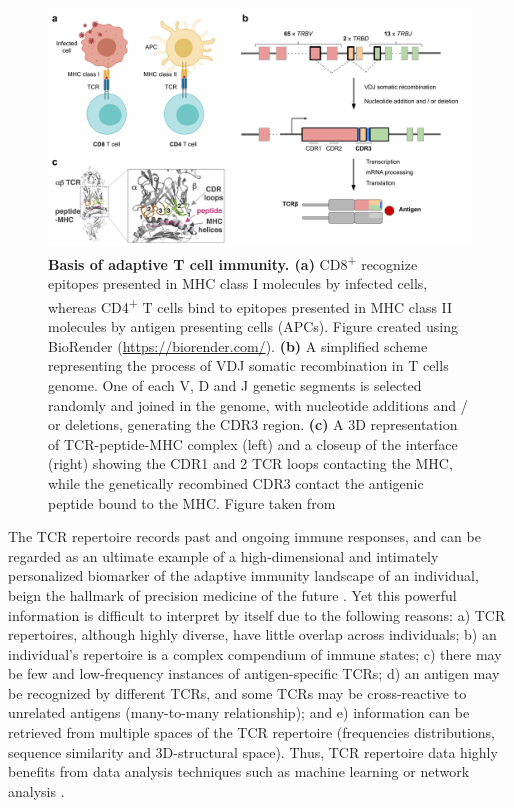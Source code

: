 \begin{figure}[!t]
	\centering
	\includegraphics[width=\textwidth,keepaspectratio]{figures/introtcr.pdf}
	\caption{\textbf{Basis of adaptive T cell immunity. (a)} CD8\textsuperscript{+} recognize epitopes presented in MHC class I molecules by infected cells, whereas CD4\textsuperscript{+} T cells bind to epitopes presented in MHC class II molecules by antigen presenting cells (APCs). Figure created using BioRender (\url{https://biorender.com/}). \textbf{(b)} A simplified scheme representing the process of VDJ somatic recombination in T cells genome. One of each V, D and J genetic segments is selected randomly and joined in the genome, with nucleotide additions and / or deletions, generating the CDR3 region. \textbf{(c)} A 3D representation of TCR-peptide-MHC complex (left) and a closeup of the interface (right) showing the CDR1 and 2 TCR loops contacting the MHC, while the genetically recombined CDR3 contact the antigenic peptide bound to the MHC. Figure taken from \cite{cdr12mhc}}
	\label{fig:introtcr}
\end{figure}


The TCR repertoire records past and ongoing immune responses, and can be regarded as an ultimate example of a high-dimensional and intimately personalized biomarker of the adaptive immunity landscape of an individual, beign the hallmark of precision medicine of the future \citep{pitfallsoport}. Yet this powerful information is difficult to interpret by itself due to the following reasons: a) TCR repertoires, although highly diverse, have little overlap across individuals; b) an individual's repertoire is a complex compendium of immune states; c) there may be few and low-frequency instances of antigen-specific TCRs; d) an antigen may be recognized by different TCRs, and some TCRs may be cross-reactive to unrelated antigens (many-to-many relationship); and e) information can be retrieved from multiple spaces of the TCR repertoire (frequencies distributions, sequence similarity and 3D-structural space). Thus, TCR repertoire data highly benefits from data analysis techniques such as machine learning or network analysis \citep{tcrml}.

